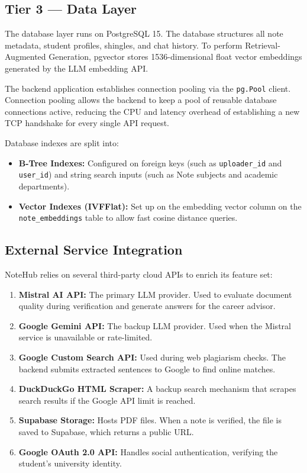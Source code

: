 \documentclass[12,Times new Roman,a4paper]{report}
\begin{document}
\subsection{Tier 3 — Data Layer}

The database layer runs on PostgreSQL 15. The database structures all note metadata, student profiles, shingles, and chat history. To perform Retrieval-Augmented Generation, pgvector stores 1536-dimensional float vector embeddings generated by the LLM embedding API. 

The backend application establishes connection pooling via the \texttt{pg.Pool} client. Connection pooling allows the backend to keep a pool of reusable database connections active, reducing the CPU and latency overhead of establishing a new TCP handshake for every single API request.

Database indexes are split into:
\begin{itemize}
    \item \textbf{B-Tree Indexes:} Configured on foreign keys (such as \texttt{uploader\_id} and \texttt{user\_id}) and string search inputs (such as Note subjects and academic departments).
    \item \textbf{Vector Indexes (IVFFlat):} Set up on the embedding vector column on the \texttt{note\_embeddings} table to allow fast cosine distance queries.
\end{itemize}

\subsection{External Service Integration}

NoteHub relies on several third-party cloud APIs to enrich its feature set:
\begin{enumerate}
    \item \textbf{Mistral AI API:} The primary LLM provider. Used to evaluate document quality during verification and generate answers for the career advisor.
    \item \textbf{Google Gemini API:} The backup LLM provider. Used when the Mistral service is unavailable or rate-limited.
    \item \textbf{Google Custom Search API:} Used during web plagiarism checks. The backend submits extracted sentences to Google to find online matches.
    \item \textbf{DuckDuckGo HTML Scraper:} A backup search mechanism that scrapes search results if the Google API limit is reached.
    \item \textbf{Supabase Storage:} Hosts PDF files. When a note is verified, the file is saved to Supabase, which returns a public URL.
    \item \textbf{Google OAuth 2.0 API:} Handles social authentication, verifying the student's university identity.
\end{enumerate}
\end{document}
